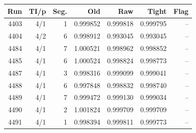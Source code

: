 \begin{tabular}{rrrrrrr}\toprule Run & TI/p & Seg. & Old & Raw & Tight & Flag\\\midrule
4403 & 4/1 & 1 & 0.999852 & 0.999818 & 0.999795 & --\\
4404 & 4/2 & 6 & 0.998912 & 0.993045 & 0.993045 & --\\
4484 & 4/1 & 7 & 1.000521 & 0.998962 & 0.998852 & --\\
4485 & 4/1 & 6 & 1.000524 & 0.998824 & 0.998773 & --\\
4487 & 4/1 & 3 & 0.998316 & 0.999099 & 0.999041 & --\\
4488 & 4/1 & 6 & 0.997848 & 0.998832 & 0.998740 & --\\
4489 & 4/1 & 7 & 0.999472 & 0.999130 & 0.999034 & --\\
4490 & 4/1 & 2 & 1.001824 & 0.999709 & 0.999709 & --\\
4491 & 4/1 & 1 & 0.998394 & 0.999811 & 0.999773 & --\\
\bottomrule\end{tabular}